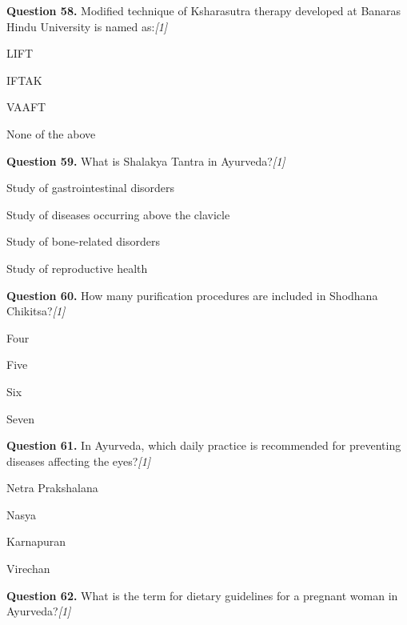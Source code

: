\documentclass[11pt,a4paper]{article}
\newcommand{\pts}[1]{\hfill   \textit{[#1]}}
\begin{document}
\medskip


\noindent   \textbf{Question 58.} Modified technique of Ksharasutra therapy developed at Banaras Hindu University is named as:\pts{1}

\begin{parts}
  \item LIFT
  \item IFTAK
  \item VAAFT
  \item None of the above
\end{parts}

\medskip


\noindent   \textbf{Question 59.} What is Shalakya Tantra in Ayurveda?\pts{1}

\begin{parts}
  \item Study of gastrointestinal disorders
  \item Study of diseases occurring above the clavicle
  \item Study of bone-related disorders
  \item Study of reproductive health
\end{parts}

\medskip


\noindent   \textbf{Question 60.} How many purification procedures are included in Shodhana Chikitsa?\pts{1}

\begin{parts}
  \item Four
  \item Five
  \item Six
  \item Seven
\end{parts}

\medskip


\noindent   \textbf{Question 61.} In Ayurveda, which daily practice is recommended for preventing diseases affecting the eyes?\pts{1}

\begin{parts}
  \item Netra Prakshalana
  \item Nasya
  \item Karnapuran
  \item Virechan
\end{parts}

\medskip


\noindent   \textbf{Question 62.} What is the term for dietary guidelines for a pregnant woman in Ayurveda?\pts{1}
\end{document}
